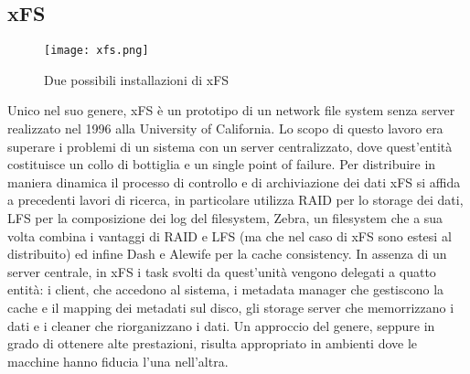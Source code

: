 \subsection{xFS}
\begin{figure}[ht]
  \begin{center}
    \texttt{[image: xfs.png]}
    \caption{Due possibili installazioni di xFS}
    \label{hyp}
  \end{center}
\end{figure}
Unico nel suo genere, xFS è un prototipo di un network file system senza server realizzato nel 1996 alla University of California. Lo scopo di questo lavoro era superare i problemi di un sistema con un server centralizzato, dove quest'entità costituisce un collo di bottiglia e un single point of failure. Per distribuire in maniera dinamica il processo di controllo e di archiviazione dei dati xFS si affida a precedenti lavori di ricerca, in particolare utilizza RAID per lo storage dei dati, LFS per la composizione dei log del filesystem, Zebra, un filesystem che a sua volta combina i vantaggi di RAID e LFS (ma che nel caso di xFS sono estesi al distribuito) ed infine Dash e Alewife per la cache consistency. In assenza di un server centrale, in xFS i task svolti da quest'unità vengono delegati a quatto entità: i client, che accedono al sistema, i metadata manager che gestiscono la cache e il mapping dei metadati sul disco, gli storage server che memorrizzano i dati e i cleaner che riorganizzano i dati. Un approccio del genere, seppure in grado di ottenere alte prestazioni, risulta appropriato in ambienti dove le macchine hanno fiducia l'una nell'altra.
